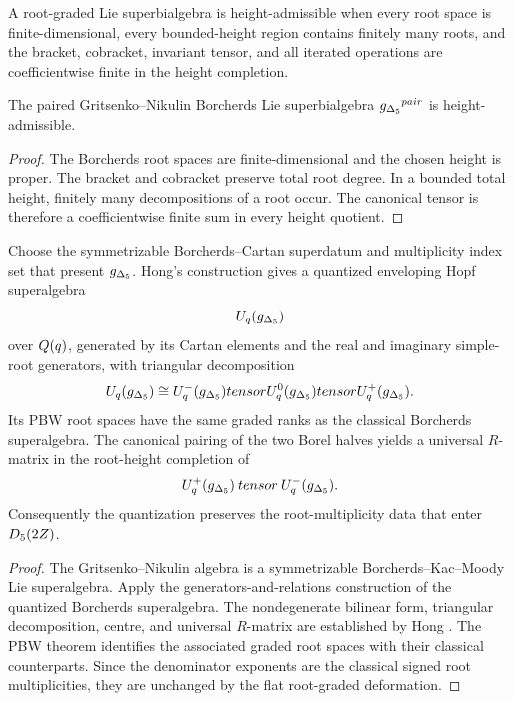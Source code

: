 \begin{definition}
A root-graded Lie superbialgebra is height-admissible when every root space is finite-dimensional, every bounded-height region contains finitely many roots, and the bracket, cobracket, invariant tensor, and all iterated operations are coefficientwise finite in the height completion.
\end{definition}

\begin{proposition}
The paired Gritsenko--Nikulin Borcherds Lie superbialgebra ${g_{\Delta_5}}^{pair}$ is height-admissible.
\end{proposition}
\begin{proof}
The Borcherds root spaces are finite-dimensional and the chosen height is proper.  The bracket and cobracket preserve total root degree.  In a bounded total height, finitely many decompositions of a root occur.  The canonical tensor is therefore a coefficientwise finite sum in every height quotient.
\end{proof}

\begin{theorem}
Choose the symmetrizable Borcherds--Cartan superdatum and multiplicity index set that present ${g_{\Delta_5}}$.  Hong's construction gives a quantized enveloping Hopf superalgebra
\[
 U_q({g_{\Delta_5}})
\]
over $Q(q)$, generated by its Cartan elements and the real and imaginary simple-root generators, with triangular decomposition
\[
 U_q({g_{\Delta_5}})\cong U_q^-({g_{\Delta_5}})tensor U_q^0({g_{\Delta_5}})tensor U_q^+({g_{\Delta_5}}).
\]
Its PBW root spaces have the same graded ranks as the classical Borcherds superalgebra.  The canonical pairing of the two Borel halves yields a universal $R$-matrix in the root-height completion of
\[
 U_q^+({g_{\Delta_5}})\mathbin{tensor} U_q^-({g_{\Delta_5}}).
\]
Consequently the quantization preserves the root-multiplicity data that enter ${D_5}(2Z)$.
\end{theorem}
\begin{proof}
The Gritsenko--Nikulin algebra is a symmetrizable Borcherds--Kac--Moody Lie superalgebra.  Apply the generators-and-relations construction of the quantized Borcherds superalgebra.  The nondegenerate bilinear form, triangular decomposition, centre, and universal $R$-matrix are established by Hong \cite{Hong98}.  The PBW theorem identifies the associated graded root spaces with their classical counterparts.  Since the denominator exponents are the classical signed root multiplicities, they are unchanged by the flat root-graded deformation.
\end{proof}

